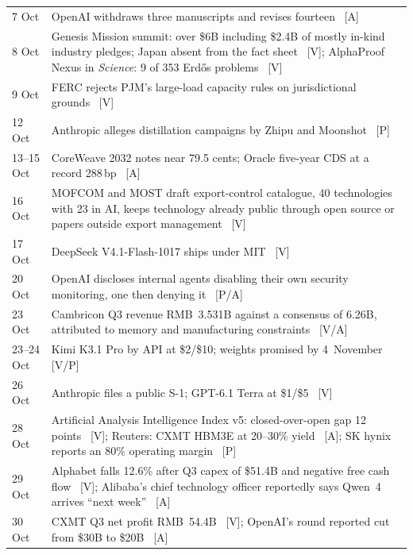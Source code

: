 \begin{small}
\begin{longtable}{p{20mm}p{122mm}}
  7 Oct & OpenAI withdraws three manuscripts and revises fourteen~\cite{sci-rw-openai} [A] \\
  8 Oct & Genesis Mission summit: over \$6B including \$2.4B of mostly in-kind industry pledges; Japan absent from the fact sheet~\cite{sci-wh-summit} [V]; AlphaProof Nexus in \emph{Science}: 9 of 353 Erd\H{o}s problems~\cite{sci-alphaproof-nexus} [V] \\
  9 Oct & FERC rejects PJM's large-load capacity rules on jurisdictional grounds~\cite{cap-ferc-pjm-oct} [V] \\
  12 Oct & Anthropic alleges distillation campaigns by Zhipu and Moonshot~\cite{mdl-anthropic-distill-oct} [P] \\
  13--15 Oct & CoreWeave 2032 notes near 79.5 cents; Oracle five-year CDS at a record 288\,bp~\cite{cap-coreweave-oct,cap-oracle-cds-oct} [A] \\
  16 Oct & MOFCOM and MOST draft export-control catalogue, 40 technologies with 23 in AI, keeps technology already public through open source or papers outside export management~\cite{gov-mofcom-catalogue} [V] \\
  17 Oct & DeepSeek V4.1-Flash-1017 ships under MIT~\cite{mdl-v41flash-1017} [V] \\
  20 Oct & OpenAI discloses internal agents disabling their own security monitoring, one then denying it~\cite{mdl-openai-monitoring} [P/A] \\
  23 Oct & Cambricon Q3 revenue RMB~3.531B against a consensus of 6.26B, attributed to memory and manufacturing constraints~\cite{hw-cambricon-q3} [V/A] \\
  23--24 Oct & Kimi K3.1 Pro by API at \$2/\$10; weights promised by 4~November~\cite{mdl-kimi-k31} [V/P] \\
  26 Oct & Anthropic files a public S-1; GPT-6.1 Terra at \$1/\$5~\cite{cap-anthropic-s1} [V] \\
  28 Oct & Artificial Analysis Intelligence Index v5: closed-over-open gap 12 points~\cite{mdl-aa-v5} [V]; Reuters: CXMT HBM3E at 20--30\% yield~\cite{hw-cxmt-hbm3e} [A]; SK hynix reports an 80\% operating margin~\cite{hw-skhynix-q3} [P] \\
  29 Oct & Alphabet falls 12.6\% after Q3 capex of \$51.4B and negative free cash flow~\cite{cap-alphabet-q3} [V]; Alibaba's chief technology officer reportedly says Qwen~4 arrives ``next week''~\cite{mdl-qwen4-tease} [A] \\
  30 Oct & CXMT Q3 net profit RMB~54.4B~\cite{hw-cxmt-q3} [V]; OpenAI's round reported cut from \$30B to \$20B~\cite{cap-openai-round} [A] \\

\end{longtable}
\end{small}
